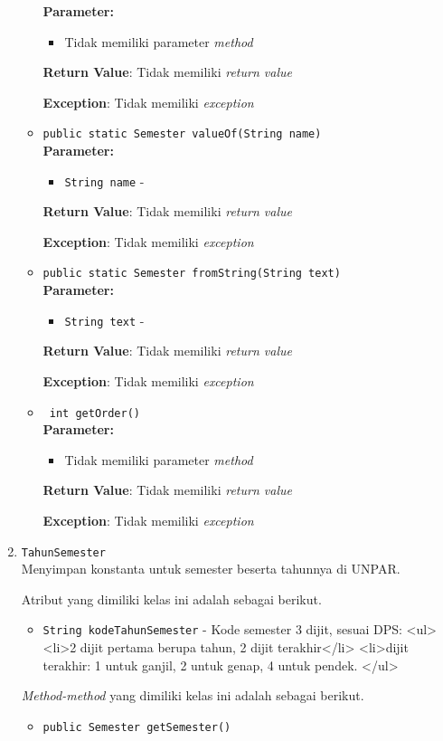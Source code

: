 \documentclass{article}
\begin{document}
\begin{enumerate}
\begin{itemize}
\textbf{Parameter:}\begin{itemize}
\item Tidak memiliki parameter \textit{method}
\end{itemize}
\textbf{Return Value}: Tidak memiliki \textit{return value}

\textbf{Exception}: Tidak memiliki \textit{exception}

\item \texttt{public static Semester valueOf(String name)}\\ 


\textbf{Parameter:}\begin{itemize}
\item \texttt{String name} - 
\end{itemize}
\textbf{Return Value}: Tidak memiliki \textit{return value}

\textbf{Exception}: Tidak memiliki \textit{exception}

\item \texttt{public static Semester fromString(String text)}\\ 


\textbf{Parameter:}\begin{itemize}
\item \texttt{String text} - 
\end{itemize}
\textbf{Return Value}: Tidak memiliki \textit{return value}

\textbf{Exception}: Tidak memiliki \textit{exception}

\item \texttt{ int getOrder()}\\ 


\textbf{Parameter:}\begin{itemize}
\item Tidak memiliki parameter \textit{method}
\end{itemize}
\textbf{Return Value}: Tidak memiliki \textit{return value}

\textbf{Exception}: Tidak memiliki \textit{exception}

\end{itemize}
\item \texttt{TahunSemester}\\ 
Menyimpan konstanta untuk semester beserta tahunnya di UNPAR.

Atribut yang dimiliki kelas ini adalah sebagai berikut.
\begin{itemize}
\item \texttt{String kodeTahunSemester} - Kode semester 3 dijit, sesuai DPS:
 <ul>
   <li>2 dijit pertama berupa tahun, 2 dijit terakhir</li>
   <li>dijit terakhir: 1 untuk ganjil, 2 untuk genap, 4 untuk pendek.
 </ul>
\end{itemize}
\textit{Method-method} yang dimiliki kelas ini adalah sebagai berikut.
\begin{itemize}
\item \texttt{public Semester getSemester()}\\ 



\end{itemize}
\end{enumerate}
\end{document}
